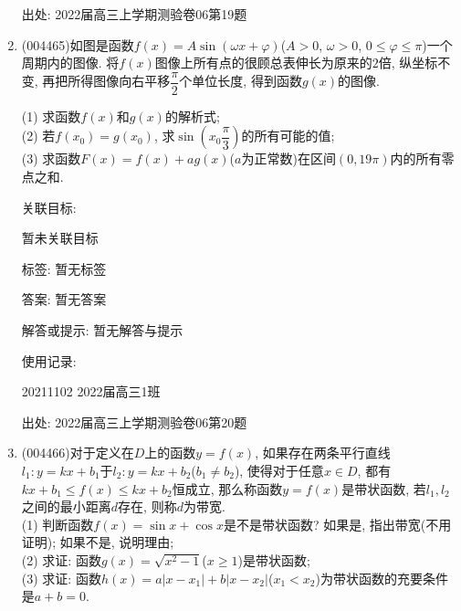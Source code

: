 \documentclass[10pt,a4paper]{article}
\begin{document}
\begin{enumerate}[1.]
出处: 2022届高三上学期测验卷06第19题
\item { (004465)}如图是函数$f(x)=A\sin (\omega x+\varphi)$($A>0$, $\omega>0$, $0\le \varphi\le \pi$)一个周期内的图像. 将$f(x)$图像上所有点的很顾总表伸长为原来的$2$倍, 纵坐标不变, 再把所得图像向右平移$\dfrac\pi 2$个单位长度, 得到函数$g(x)$的图像.
\begin{center}
\end{center}
(1) 求函数$f(x)$和$g(x)$的解析式;\\
(2) 若$f(x_0)=g(x_0)$, 求$\sin (x_0\dfrac\pi 3)$的所有可能的值;\\
(3) 求函数$F(x)=f(x)+ag(x)$($a$为正常数)在区间$(0,19\pi)$内的所有零点之和.


关联目标:

暂未关联目标



标签: 暂无标签

答案: 暂无答案

解答或提示: 暂无解答与提示

使用记录:

20211102	2022届高三1班			


出处: 2022届高三上学期测验卷06第20题
\item { (004466)}对于定义在$D$上的函数$y=f(x)$, 如果存在两条平行直线$l_1:y=kx+b_1$于$l_2:y=kx+b_2$($b_1\ne b_2$), 使得对于任意$x\in D$, 都有$kx+b_1\le f(x)\le kx+b_2$恒成立, 那么称函数$y=f(x)$是带状函数, 若$l_1,l_2$之间的最小距离$d$存在, 则称$d$为带宽.\\
(1) 判断函数$f(x)=\sin x+\cos x$是不是带状函数? 如果是, 指出带宽(不用证明); 如果不是, 说明理由;\\
(2) 求证: 函数$g(x)=\sqrt{x^2-1}$($x\ge 1$)是带状函数;\\
(3) 求证: 函数$h(x)=a|x-x_1|+b|x-x_2|$($x_1<x_2$)为带状函数的充要条件是$a+b=0$.



\end{enumerate}
\end{document}
